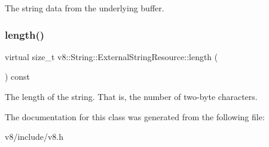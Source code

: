 The string data from the underlying buffer. \mbox{\label{classv8_1_1String_1_1ExternalStringResource_ab5ca300fea077d7c7774ec49d32e4da1}} 
\subsubsection{\texorpdfstring{length()}{length()}}
{\footnotesize\ttfamily virtual size\+\_\+t v8\+::\+String\+::\+External\+String\+Resource\+::length (\begin{DoxyParamCaption}{ }\end{DoxyParamCaption}) const\hspace{0.3cm}{\ttfamily [pure virtual]}}

The length of the string. That is, the number of two-\/byte characters. 

The documentation for this class was generated from the following file\+:\begin{DoxyCompactItemize}
\item 
v8/include/v8.\+h\end{DoxyCompactItemize}
